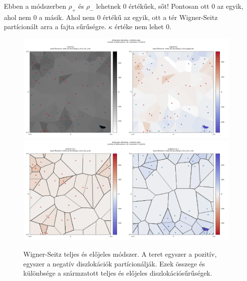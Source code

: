 \documentclass[10pt,a4paper]{scrartcl}
\begin{document}
Ebben a módszerben $\rho_+$ és $\rho_-$ lehetnek 0 értékűek, sőt! Pontosan ott 0 az egyik, ahol nem 0 a másik. Ahol nem 0 értékű az egyik, ott a tér Wigner-Seitz partícionált arra a fajta sűrűségre. $\kappa$ értéke nem lehet 0.

\begin{center}
\begin{figure}
\includegraphics[width=\textwidth]{"../xautocorr/example_with_64_dislocations/1000_64.dconfwspn_r512_ts.txt"}
\includegraphics[width=\textwidth]{"../xautocorr/example_with_64_dislocations/1000_64.dconfwspn_r512_pn.txt"}
\caption{Wigner-Seitz teljes és előjeles módszer. A teret egyszer a pozitív, egyszer a negatív diszlokációk partícionálják. Ezek összege és különbsége a szármzatott teljes és előjeles diszlokációsűrűségek.}
\end{figure}
\end{center}
\end{document}
